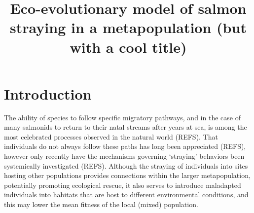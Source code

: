 \documentclass[twocolumn,preprintnumbers,amsmath,amssymb,superscriptaddress]{revtex4}
\begin{document}
\title{Eco-evolutionary model of salmon straying in a metapopulation (but with a cool title)}



\maketitle



\section*{Introduction}


The ability of species to follow specific migratory pathways, and in the case of many salmonids to return to their natal streams after years at sea, is among the most celebrated processes observed in the natural world (REFS).
That individuals do not always follow these paths has long been appreciated (REFS), however only recently have the mechanisms governing `straying' behaviors been systemically investigated (REFS).
Although the straying of individuals into sites hosting other populations provides connections within the larger metapopulation, potentially promoting ecological rescue, it also serves to introduce maladapted individuals into habitats that are host to different environmental conditions, and this may lower the mean fitness of the local (mixed) population.
\end{document}
